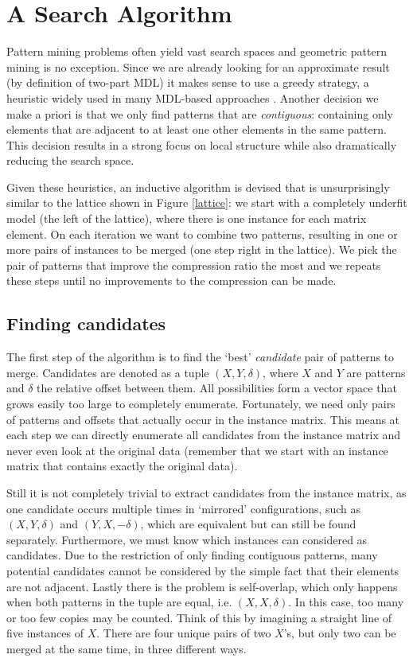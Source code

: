 \documentclass{llncs}
\begin{document}
\section{A Search Algorithm}

Pattern mining problems often yield vast search spaces and geometric pattern mining is no exception. Since we are already looking for an approximate result (by definition of two-part MDL) it makes sense to use a greedy strategy, a heuristic widely used in many MDL-based approaches \cite{krimp,slim,classy}. Another decision we make a priori is that we only find patterns that are \emph{contiguous}: containing only elements that are adjacent to at least one other elements in the same pattern. This decision results in a strong focus on local structure while also dramatically reducing the search space. 

Given these heuristics, an inductive algorithm is devised that is unsurprisingly similar to the lattice shown in Figure \ref{lattice}:  we start with a completely underfit model (the left of the lattice), where there is one instance for each matrix element. On each iteration we want to combine two patterns, resulting in one or more pairs of instances to be merged (one step right in the lattice). We pick the pair of patterns that improve the compression ratio the most and we repeats these steps until no improvements to the compression can be made.

\subsection{Finding candidates}

The first step of the algorithm is to find the `best' \emph{candidate} pair of patterns to merge. Candidates are denoted as a tuple $(X,Y,\delta)$, where $X$ and $Y$ are patterns and $\delta$ the relative offset between them. All possibilities form a vector space that grows easily too large to completely enumerate. Fortunately, we need only pairs of patterns and offsets that actually occur in the instance matrix. This means at each step we can directly enumerate all candidates from the instance matrix and never even look at the original data (remember that we start with an instance matrix that contains exactly the original data).  

Still it is not completely trivial to extract candidates from the instance matrix, as one candidate occurs multiple times in `mirrored' configurations, such as $(X,Y,\delta)$ and $(Y,X,-\delta)$, which are equivalent but can still be found separately. Furthermore, we must know which instances can considered as candidates. Due to the restriction of only finding contiguous patterns, many potential candidates cannot be considered by the simple fact that their elements are not adjacent. Lastly there is the problem is self-overlap, which only happens when both patterns in the tuple are equal, i.e. $(X,X,\delta)$. In this case, too many or too few copies may be counted. Think of this by imagining a straight line of five instances of $X$. There are four unique pairs of two $X$'s, but only two can be merged at the same time, in three different ways.
\end{document}
